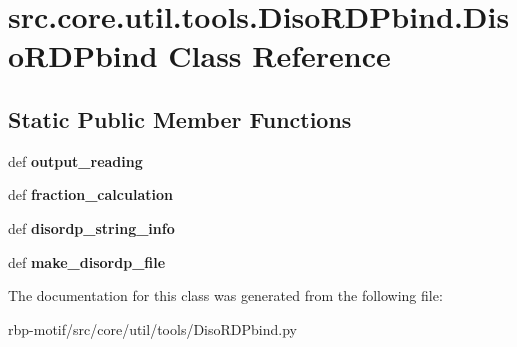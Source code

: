 \hypertarget{classsrc_1_1core_1_1util_1_1tools_1_1DisoRDPbind_1_1DisoRDPbind}{\section{src.\-core.\-util.\-tools.\-Diso\-R\-D\-Pbind.\-Diso\-R\-D\-Pbind Class Reference}
\label{classsrc_1_1core_1_1util_1_1tools_1_1DisoRDPbind_1_1DisoRDPbind}
}
\subsection*{Static Public Member Functions}
\begin{DoxyCompactItemize}
\item 
\hypertarget{classsrc_1_1core_1_1util_1_1tools_1_1DisoRDPbind_1_1DisoRDPbind_a67d038b2f2d9d597cacc5e65c1d6f4e6}{def {\bfseries output\-\_\-reading}}\label{classsrc_1_1core_1_1util_1_1tools_1_1DisoRDPbind_1_1DisoRDPbind_a67d038b2f2d9d597cacc5e65c1d6f4e6}

\item 
\hypertarget{classsrc_1_1core_1_1util_1_1tools_1_1DisoRDPbind_1_1DisoRDPbind_ab3e4c7a45927bf1ad55081ed39853649}{def {\bfseries fraction\-\_\-calculation}}\label{classsrc_1_1core_1_1util_1_1tools_1_1DisoRDPbind_1_1DisoRDPbind_ab3e4c7a45927bf1ad55081ed39853649}

\item 
\hypertarget{classsrc_1_1core_1_1util_1_1tools_1_1DisoRDPbind_1_1DisoRDPbind_ad4a93b27f41380e426a360536393ffa9}{def {\bfseries disordp\-\_\-string\-\_\-info}}\label{classsrc_1_1core_1_1util_1_1tools_1_1DisoRDPbind_1_1DisoRDPbind_ad4a93b27f41380e426a360536393ffa9}

\item 
\hypertarget{classsrc_1_1core_1_1util_1_1tools_1_1DisoRDPbind_1_1DisoRDPbind_aff8e137007a6f1d68452870fa135eb31}{def {\bfseries make\-\_\-disordp\-\_\-file}}\label{classsrc_1_1core_1_1util_1_1tools_1_1DisoRDPbind_1_1DisoRDPbind_aff8e137007a6f1d68452870fa135eb31}

\end{DoxyCompactItemize}


The documentation for this class was generated from the following file\-:\begin{DoxyCompactItemize}
\item 
rbp-\/motif/src/core/util/tools/Diso\-R\-D\-Pbind.\-py\end{DoxyCompactItemize}
